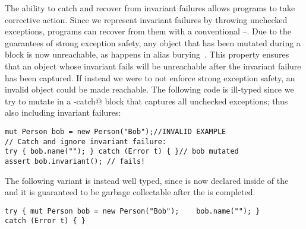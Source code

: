 The ability to catch and recover from invariant failures allows programs to take corrective action.
Since we represent invariant failures by throwing unchecked exceptions, programs can recover from them with a conventional \Q@try@--\Q@catch@.
	Due to the guarantees of strong exception safety, any object that has been mutated during a \Q@try@ block is now unreachable, as happens in alias burying~\cite{boyland2001alias}.
 This property ensures that an object whose invariant fails will be unreachable after the invariant failure has been captured. %
If instead we were to not enforce strong exception safety, an invalid object could be made reachable.
The following code is ill-typed since we try to mutate \Q@bob@ in a \Q@try-catch@ block that captures all unchecked exceptions; thus also including invariant failures:
\begin{lstlisting}[morekeywords={assert}]
mut Person bob = new Person("Bob");//INVALID EXAMPLE
// Catch and ignore invariant failure:
try { bob.name(""); } catch (Error t) { }// bob mutated
assert bob.invariant(); // fails!
\end{lstlisting}
The following variant is instead well typed, since \Q@bob@ is now declared inside of the \Q@try@ and it is guaranteed to be garbage collectable after the \Q@try@ is completed.
\begin{lstlisting}[morekeywords={assert}]
try { mut Person bob = new Person("Bob");    bob.name(""); } 
catch (Error t) { }
\end{lstlisting}



